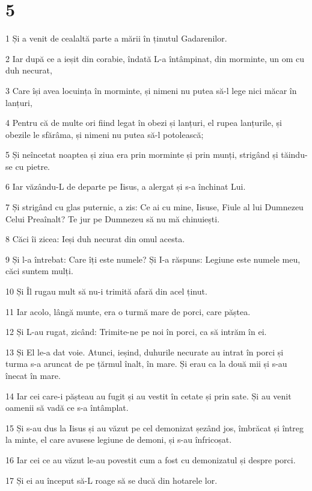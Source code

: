 \chapter{5}

\par 1 Și a venit de cealaltă parte a mării în ținutul Gadarenilor.
\par 2 Iar după ce a ieșit din corabie, îndată L-a întâmpinat, din morminte, un om cu duh necurat,
\par 3 Care își avea locuința în morminte, și nimeni nu putea să-l lege nici măcar în lanțuri,
\par 4 Pentru că de multe ori fiind legat în obezi și lanțuri, el rupea lanțurile, și obezile le sfărâma, și nimeni nu putea să-l potolească;
\par 5 Și neîncetat noaptea și ziua era prin morminte și prin munți, strigând și tăindu-se cu pietre.
\par 6 Iar văzându-L de departe pe Iisus, a alergat și s-a închinat Lui.
\par 7 Și strigând cu glas puternic, a zis: Ce ai cu mine, Iisuse, Fiule al lui Dumnezeu Celui Preaînalt? Te jur pe Dumnezeu să nu mă chinuiești.
\par 8 Căci îi zicea: Ieși duh necurat din omul acesta.
\par 9 Și l-a întrebat: Care îți este numele? Și I-a răspuns: Legiune este numele meu, căci suntem mulți.
\par 10 Și Îl rugau mult să nu-i trimită afară din acel ținut.
\par 11 Iar acolo, lângă munte, era o turmă mare de porci, care păștea.
\par 12 Și L-au rugat, zicând: Trimite-ne pe noi în porci, ca să intrăm în ei.
\par 13 Și El le-a dat voie. Atunci, ieșind, duhurile necurate au intrat în porci și turma s-a aruncat de pe țărmul înalt, în mare. Și erau ca la două mii și s-au înecat în mare.
\par 14 Iar cei care-i pășteau au fugit și au vestit în cetate și prin sate. Și au venit oamenii să vadă ce s-a întâmplat.
\par 15 Și s-au dus la Iisus și au văzut pe cel demonizat șezând jos, îmbrăcat și întreg la minte, el care avusese legiune de demoni, și s-au înfricoșat.
\par 16 Iar cei ce au văzut le-au povestit cum a fost cu demonizatul și despre porci.
\par 17 Și ei au început să-L roage să se ducă din hotarele lor.
